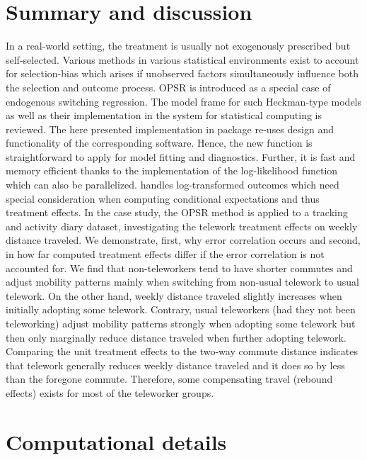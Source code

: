 \documentclass[%
    twoside, openright, titlepage, numbers=noenddot,%
    cleardoublepage=empty,%
    abstract=false,%
    BCOR=5.5mm, paper=a5, fontsize=10pt,%
]{scrreprt}
\begin{document}
\section{Summary and discussion} \label{sec:summary}

In a real-world setting, the treatment is usually not exogenously prescribed but self-selected. Various methods in various statistical environments exist to account for selection-bias which arises if unobserved factors simultaneously influence both the selection and outcome process. OPSR is introduced as a special case of endogenous switching regression. The model frame for such Heckman-type models as well as their implementation in the  system for statistical computing is reviewed. The here presented  implementation in package  re-uses design and functionality of the corresponding  software. Hence, the new function  is straightforward to apply for model fitting and diagnostics. Further, it is fast and memory efficient thanks to the  implementation of the log-likelihood function which can also be parallelized.  handles log-transformed outcomes which need special consideration when computing conditional expectations and thus treatment effects. In the case study, the OPSR method is applied to a tracking and activity diary dataset, investigating the telework treatment effects on weekly distance traveled. We demonstrate, first, why error correlation occurs and second, in how far computed treatment effects differ if the error correlation is not accounted for. We find that non-teleworkers tend to have shorter commutes and adjust mobility patterns mainly when switching from non-usual telework to usual telework. On the other hand, weekly distance traveled slightly increases when initially adopting some telework. Contrary, usual teleworkers (had they not been teleworking) adjust mobility patterns strongly when adopting some telework but then only marginally reduce distance traveled when further adopting telework. Comparing the unit treatment effects to the two-way commute distance indicates that telework generally reduces weekly distance traveled and it does so by less than the foregone commute. Therefore, some compensating travel (rebound effects) exists for most of the teleworker groups.



\section*{Computational details}
\end{document}

